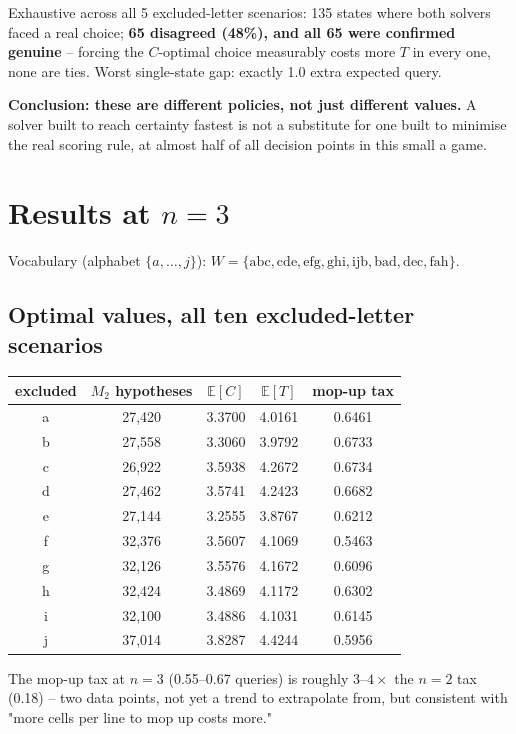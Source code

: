 \documentclass[11pt]{article}
\begin{document}
Exhaustive across all 5 excluded-letter scenarios: 135 states where both
solvers faced a real choice; \textbf{65 disagreed (48\%), and all 65 were
confirmed genuine} -- forcing the $C$-optimal choice measurably costs
more $T$ in every one, none are ties. Worst single-state gap: exactly 1.0
extra expected query.

\textbf{Conclusion: these are different policies, not just different
values.} A solver built to reach certainty fastest is not a substitute
for one built to minimise the real scoring rule, at almost half of all
decision points in this small a game.

\section{Results at $n=3$}
\label{sec:n3}

Vocabulary (alphabet $\{a,\ldots,j\}$): $W = \{\mathrm{abc, cde, efg,
ghi, ijb, bad, dec, fah}\}$.

\subsection{Optimal values, all ten excluded-letter scenarios}

\begin{center}
\begin{tabular}{ccccc}
\toprule
excluded & $M_2$ hypotheses & $\mathbb{E}[C]$ & $\mathbb{E}[T]$ & mop-up tax \\
\midrule
a & 27{,}420 & 3.3700 & 4.0161 & 0.6461 \\
b & 27{,}558 & 3.3060 & 3.9792 & 0.6733 \\
c & 26{,}922 & 3.5938 & 4.2672 & 0.6734 \\
d & 27{,}462 & 3.5741 & 4.2423 & 0.6682 \\
e & 27{,}144 & 3.2555 & 3.8767 & 0.6212 \\
f & 32{,}376 & 3.5607 & 4.1069 & 0.5463 \\
g & 32{,}126 & 3.5576 & 4.1672 & 0.6096 \\
h & 32{,}424 & 3.4869 & 4.1172 & 0.6302 \\
i & 32{,}100 & 3.4886 & 4.1031 & 0.6145 \\
j & 37{,}014 & 3.8287 & 4.4244 & 0.5956 \\
\bottomrule
\end{tabular}
\end{center}

The mop-up tax at $n=3$ (0.55--0.67 queries) is roughly $3$--$4\times$ the
$n=2$ tax (0.18) -- two data points, not yet a trend to extrapolate from,
but consistent with "more cells per line to mop up costs more."
\end{document}
